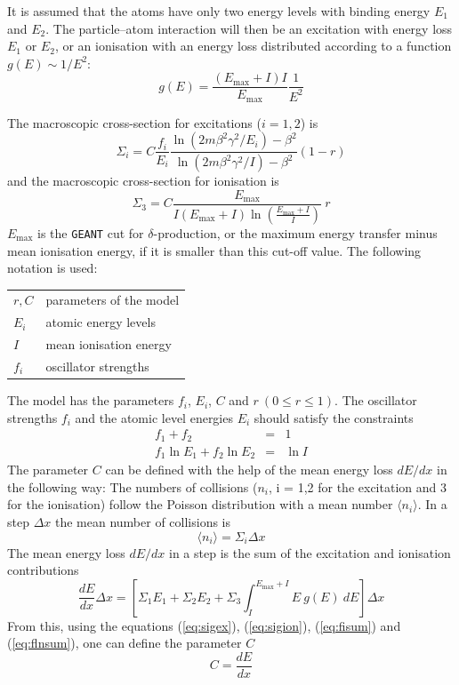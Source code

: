 \documentclass{article}
\let\SetRowColor\relax
\newcommand{\Emax}{\ensuremath{E_{\mathrm{max}}}}
\newcommand{\GEANT}{\texttt{GEANT}}
\begin{document}
It is assumed that the atoms have only two energy levels with binding
energy $E_1$ and $E_2$.  The particle--atom interaction will then be
an excitation with energy loss $E_1$ or $E_2$, or an ionisation with
an energy loss distributed according to a function $g(E) \sim 1/E^2$:
\begin{equation}
g(E) = \frac{(\Emax + I)I}{\Emax} \frac{1}{E^2}
\end{equation}

The macroscopic cross-section for excitations ($i=1,2$) is
\begin{equation}
\label{eq:sigex}
\Sigma_i = C \frac{f_i}{E_i} \frac{\ln (2 m \beta^2 \gamma^2/E_i) - \beta^2}
             {\ln (2 m \beta^2 \gamma^2/ I) - \beta^2}(1-r)
\end{equation}
and the macroscopic cross-section for ionisation is
\begin{equation}
\label{eq:sigion}
\Sigma_3 = C \frac{\Emax}{I(\Emax+I) \ln(\frac{\Emax+I}{I})}
           ~ r
\end{equation}
\Emax{} is the \GEANT{} cut for $\delta$-production, or the maximum
energy transfer minus mean ionisation energy, if it is smaller than
this cut-off value.  The following notation is used:

\begin{tabular}{ll}
\SetRowColor $r, C$          & parameters of the model \\
\SetRowColor $E_i$           & atomic energy levels \\
\SetRowColor $I$             & mean ionisation energy \\
\SetRowColor ${f_i}$         & oscillator strengths 
\end{tabular}

The model has the parameters $f_i$, $E_i$, $C$ and $r ~(0\leq r\leq
1)$.  The oscillator strengths $f_i$ and the atomic level energies
$E_i$ should satisfy the constraints
\begin{eqnarray}
f_1 + f_2 & = & 1  \label{eq:fisum}\\
f_1 \ln E_1 + f_2 \ln E_2 & = & \ln I \label{eq:flnsum}
\end{eqnarray}
The parameter $C$ can be defined with the help of the mean energy loss
$dE/dx$ in the following way: The numbers of collisions ($n_i$, i =
1,2 for the excitation and 3 for the ionisation) follow the Poisson
distribution with a mean number $ \langle n_i \rangle $. In a step
$\Delta x$ the mean number of collisions is
\begin{equation}
\langle n_i \rangle = \Sigma_i \Delta x
\end{equation}
The mean energy loss $dE/dx$ in a step is the sum of the excitation
and ionisation contributions
\begin{equation}
\frac{dE}{dx} \Delta x = \left[ \Sigma_1 E_1 + \Sigma_2 E_2 +
                          \Sigma_3 \int_{I}^{\Emax+I} E~g(E)~dE \right]
                         \Delta x
\end{equation}
From this, using the equations (\ref{eq:sigex}), (\ref{eq:sigion}),
(\ref{eq:fisum}) and (\ref{eq:flnsum}), one can define the parameter
$C$
\begin{equation}
C = \frac{dE}{dx}
\end{equation}
\end{document}
